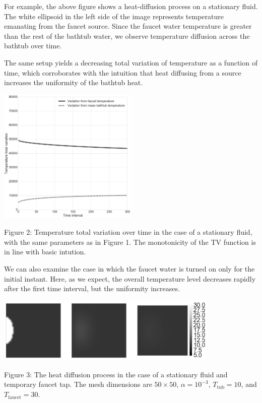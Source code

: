 \documentclass[12pt]{article}
\begin{document}
For example, the above figure shows a heat-diffusion process on a stationary
fluid. The white ellipsoid in the left side of the image represents temperature
emanating from the faucet source. Since the faucet water temperature is greater
than the rest of the bathtub water, we observe temperature diffusion across the
bathtub over time.

The same setup yields a decreasing total variation of temperature as a function
of time, which corroborates with the intuition that heat diffusing from a source
increases the uniformity of the bathtub heat.

\begin{center}
    \includegraphics[width=0.5\textwidth]{../plots/tv-01.png}

    Figure 2: Temperature total variation over time in the case of a stationary
    fluid, with the same parameters as in Figure 1. The monotonicity of the TV
    function is in line with basic intution.
\end{center}

We can also examine the case in which the faucet water is turned on only for the
initial instant. Here, as we expect, the overall temperature level decreases
rapidly after the first time interval, but the uniformity increases. 

\begin{center}
    \includegraphics[width=0.8\textwidth]{../plots/diffusion-02.png}

    Figure 3: The heat diffusion process in the case of a stationary fluid and
    temporary faucet tap. The mesh dimensions are $50 \times 50$, $\alpha =
    10^{-3}$, $T_{\mathrm{tub}} = 10$, and $T_{\mathrm{faucet}} = 30$.
\end{center}
\end{document}
